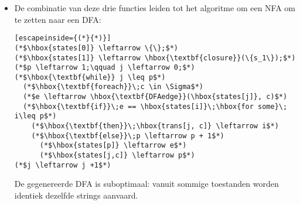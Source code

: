\begin{itemize}
\begin{enumerate}
		Via deze functie, de startstaat $s_1$ en input string $c_1, ..., c_k$ kan de NFA simulatie als volgt geschreven worden:
			\begin{lstlisting}[escapeinside={(*}{*)}]
(*$d \leftarrow \hbox{\textbf{closure}}(\{s_1\})$*)
(*$\hbox{\textbf{for}} i \leftarrow 1\;\hbox{\textbf{to}}\;k$*)
  (*$d \leftarrow \hbox{\textbf{DFAedge}}(d, c_i)$*)
			\end{lstlisting}
	
		
	\end{enumerate}
	\item De combinatie van deze drie functies leiden tot het algoritme om een NFA om te zetten naar een DFA:
	\begin{lstlisting}[escapeinside={(*}{*)}]
(*$\hbox{states[0]} \leftarrow \{\};$*)
(*$\hbox{states[1]} \leftarrow \hbox{\textbf{closure}}(\{s_1\});$*)
(*$p \leftarrow 1;\qquad j \leftarrow 0;$*)
(*$\hbox{\textbf{while}} j \leq p$*)
  (*$\hbox{\textbf{foreach}}\;c \in \Sigma$*)
  (*$e \leftarrow \hbox{\textbf{DFAedge}}(\hbox{states[j]}, c)$*)
  (*$\hbox{\textbf{if}}\;e == \hbox{states[i]}\;\hbox{for some}\; i\leq p$*)
    (*$\hbox{\textbf{then}}\;\hbox{trans[j, c]} \leftarrow i$*)
    (*$\hbox{\textbf{else}}\;p \leftarrow p + 1$*)
      (*$\hbox{states[p]} \leftarrow e$*)
      (*$\hbox{states[j,c]} \leftarrow p$*)
(*$j \leftarrow j +1$*)
	\end{lstlisting}
	De gegenereerde DFA is suboptimaal: vanuit sommige toestanden worden identiek dezelfde strings aanvaard. 
\end{itemize}



